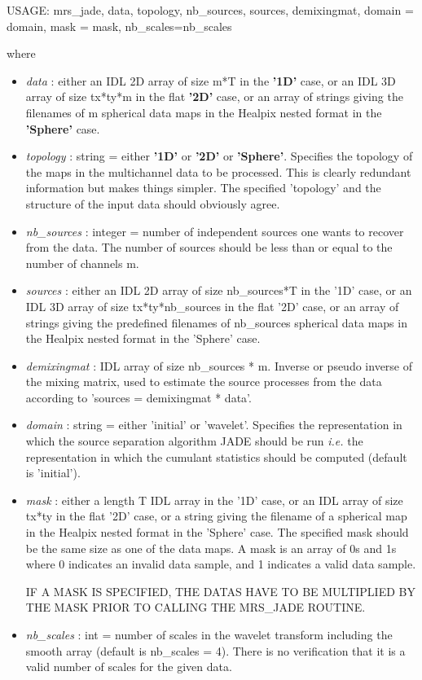 {\bf
\begin{center}
     USAGE:  mrs\_jade, data, topology, nb\_sources, sources, demixingmat, domain = domain, mask = mask, nb\_scales=nb\_scales
\end{center}}
where
\begin{itemize}
\item {\em data} : either an IDL 2D array of size m*T in the \textbf{'1D'} case, or an IDL 3D array of size tx*ty*m 
in the flat \textbf{'2D'} case, or an array of strings giving the filenames of m spherical data maps in the Healpix 
nested format in the \textbf{'Sphere'} case. 

\item {\em topology} : string = either \textbf{'1D'} or \textbf{'2D'} or \textbf{'Sphere'}. Specifies the topology 
of the maps in the multichannel data to be processed. This is clearly redundant information but makes things simpler. 
The specified 'topology' and the structure of the input data should obviously agree.

\item {\em nb\_sources} : integer = number of independent sources one wants to recover from the data. 
The number of sources should be less than or equal to the number of channels m.

\item {\em sources} : either an IDL 2D array of size nb\_sources*T in the '1D' case, or an IDL 3D array 
of size tx*ty*nb\_sources in the flat '2D' case, or an array of strings giving the predefined filenames 
of nb\_sources spherical data maps in the Healpix nested format in the 'Sphere' case. 

\item {\em demixingmat} : IDL array of size nb\_sources * m. Inverse or pseudo inverse of the mixing matrix, 
used to estimate the source processes from the data according to 'sources = demixingmat * data'.

\item {\em domain} : string = either 'initial' or 'wavelet'. Specifies the representation in which the source separation algorithm 
JADE should be run \emph{i.e.} the representation in which the cumulant statistics should be computed (default is 'initial').	

\item {\em mask} : either a length T IDL array in the '1D' case, or an IDL array of size tx*ty in the flat '2D' case, 
or a string giving the filename of a spherical map in the Healpix nested format in the 'Sphere' case. The specified 
mask should be the same size as one of the data maps. A mask is an array of 0s and 1s where 0 indicates an invalid 
data sample, and 1 indicates a valid data sample.

IF A MASK IS SPECIFIED, THE DATAS HAVE TO BE MULTIPLIED BY THE MASK PRIOR TO CALLING THE MRS\_JADE ROUTINE.

\item {\em nb\_scales} : int = number of scales in the wavelet transform including the smooth array (default is nb\_scales = 4). There is no verification that it is a valid number of scales for the given data.

\end{itemize}


